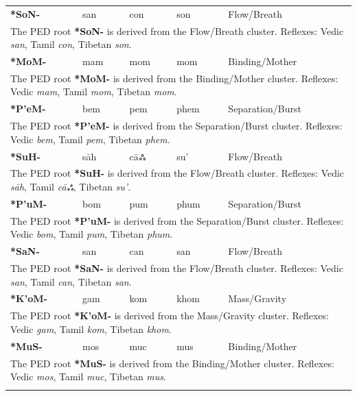 \begin{longtable}{p{} p{} p{} p{} p{}}
\textbf{*SoN-} & san & con & son & Flow/Breath \\ 
\multicolumn{5}{p{\textwidth}}{\small The PED root \textbf{*SoN-} is derived from the Flow/Breath cluster. Reflexes: Vedic \textit{san}, Tamil \textit{con}, Tibetan \textit{son}. } \\ \addlinespace 
\textbf{*MoM-} & mam & mom & mom & Binding/Mother \\ 
\multicolumn{5}{p{\textwidth}}{\small The PED root \textbf{*MoM-} is derived from the Binding/Mother cluster. Reflexes: Vedic \textit{mam}, Tamil \textit{mom}, Tibetan \textit{mom}. } \\ \addlinespace 
\textbf{*P'eM-} & bem & pem & phem & Separation/Burst \\ 
\multicolumn{5}{p{\textwidth}}{\small The PED root \textbf{*P'eM-} is derived from the Separation/Burst cluster. Reflexes: Vedic \textit{bem}, Tamil \textit{pem}, Tibetan \textit{phem}. } \\ \addlinespace 
\textbf{*SuH-} & sāh & cāஃ & su' & Flow/Breath \\ 
\multicolumn{5}{p{\textwidth}}{\small The PED root \textbf{*SuH-} is derived from the Flow/Breath cluster. Reflexes: Vedic \textit{sāh}, Tamil \textit{cāஃ}, Tibetan \textit{su'}. } \\ \addlinespace 
\textbf{*P'uM-} & bom & pum & phum & Separation/Burst \\ 
\multicolumn{5}{p{\textwidth}}{\small The PED root \textbf{*P'uM-} is derived from the Separation/Burst cluster. Reflexes: Vedic \textit{bom}, Tamil \textit{pum}, Tibetan \textit{phum}. } \\ \addlinespace 
\textbf{*SaN-} & san & can & san & Flow/Breath \\ 
\multicolumn{5}{p{\textwidth}}{\small The PED root \textbf{*SaN-} is derived from the Flow/Breath cluster. Reflexes: Vedic \textit{san}, Tamil \textit{can}, Tibetan \textit{san}. } \\ \addlinespace 
\textbf{*K'oM-} & gam & kom & khom & Mass/Gravity \\ 
\multicolumn{5}{p{\textwidth}}{\small The PED root \textbf{*K'oM-} is derived from the Mass/Gravity cluster. Reflexes: Vedic \textit{gam}, Tamil \textit{kom}, Tibetan \textit{khom}. } \\ \addlinespace 
\textbf{*MuS-} & mos & muc & mus & Binding/Mother \\ 
\multicolumn{5}{p{\textwidth}}{\small The PED root \textbf{*MuS-} is derived from the Binding/Mother cluster. Reflexes: Vedic \textit{mos}, Tamil \textit{muc}, Tibetan \textit{mus}. } \\ \addlinespace 

\end{longtable}
